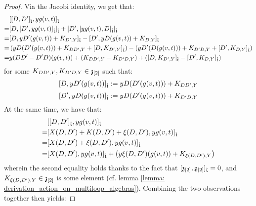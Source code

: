 \begin{proof}
                Via the Jacobi identity, we get that:
                    $$
                        \begin{aligned}
                            & [ [D, D']_{\hat{\mathfrak{t}}}, y g(v, t) ]_{\hat{\mathfrak{t}}}
                            \\
                            = & [ D, [ D', y g(v, t) ]_{\hat{\mathfrak{t}}} ]_{\hat{\mathfrak{t}}} + [ D', [ y g(v, t), D ]_{\hat{\mathfrak{t}}} ]_{\hat{\mathfrak{t}}}
                            \\
                            = & [ D, y D'( g(v, t) ) + K_{D', Y} ]_{\hat{\mathfrak{t}}} - [ D', y D( g(v, t) ) + K_{D, Y} ]_{\hat{\mathfrak{t}}}
                            \\
                            = & \left( y D( D'(g(v, t)) ) + K_{DD', Y} + [ D, K_{D', Y} ]_{\hat{\mathfrak{t}}} \right) - \left( y D'( D(g(v, t)) ) + K_{D'D, Y} + [ D', K_{D, Y} ]_{\hat{\mathfrak{t}}} \right)
                            \\
                            = & y (DD' - D'D)( g(v, t) ) + ( K_{DD', Y} - K_{D'D, Y} ) + ( [ D, K_{D', Y} ]_{\hat{\mathfrak{t}}} - [ D', K_{D, Y} ]_{\hat{\mathfrak{t}}} )
                        \end{aligned}
                    $$
                for some $K_{DD', Y}, K_{D'D, Y} \in \mathfrak{z}_{[2]}$ such that:
                    $$[ D, y D'( g(v, t) ) ]_{\hat{\mathfrak{t}}} := y D( D'( g(v, t) ) ) + K_{DD', Y}$$
                    $$[ D', y D( g(v, t) ) ]_{\hat{\mathfrak{t}}} := y D( D'( g(v, t) ) ) + K_{D'D, Y}$$
                At the same time, we have that:
                    $$
                        \begin{aligned}
                            & [ [D, D']_{\hat{\mathfrak{t}}}, y g(v, t) ]_{\hat{\mathfrak{t}}}
                            \\
                            = & [ X(D, D') + K(D, D') + \xi(D, D') , y g(v, t) ]_{\hat{\mathfrak{t}}}
                            \\
                            = & [ X(D, D') + \xi(D, D') , y g(v, t) ]_{\hat{\mathfrak{t}}}
                            \\
                            = & [ X(D, D') , y g(v, t) ]_{\hat{\mathfrak{t}}} + \left( y \xi(D, D')(g(v, t)) + K_{\xi(D, D'), Y} \right)
                        \end{aligned}
                    $$
                wherein the second equality holds thanks to the fact that $[\mathfrak{z}_{[2]}, \mathfrak{g}_{[2]}]_{\hat{\mathfrak{t}}} = 0$, and $K_{\xi(D, D'), Y} \in \mathfrak{z}_{[2]}$ is some element (cf. lemma \ref{lemma: derivation_action_on_multiloop_algebras}). Combining the two observations together then yields:

\end{proof}
